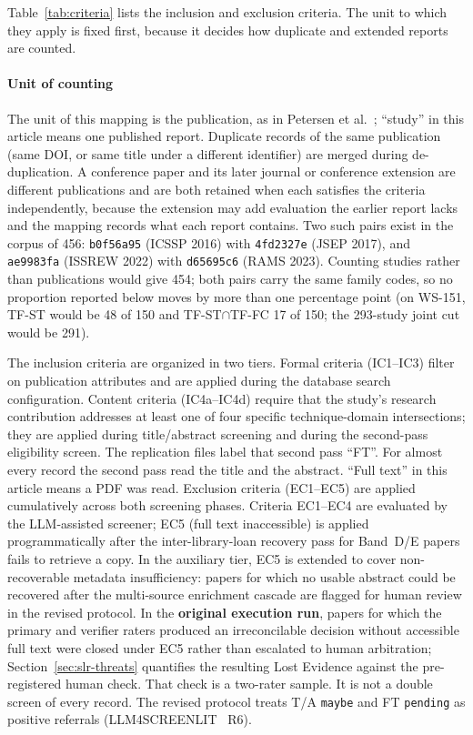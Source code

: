 Table~\ref{tab:criteria} lists the inclusion and exclusion criteria. The
unit to which they apply is fixed first, because it decides how duplicate
and extended reports are counted.

\paragraph{Unit of counting} The unit of this mapping is the publication,
as in Petersen et al.~\cite{petersen2015}; ``study'' in this article means
one published report. Duplicate records of the same publication (same
DOI, or same title under a different identifier) are merged during
de-duplication. A conference paper and its later journal or conference
extension are different publications and are both retained when each
satisfies the criteria independently, because the extension may add
evaluation the earlier report lacks and the mapping records what each
report contains. Two such pairs exist in the corpus of 456:
\texttt{b0f56a95} (ICSSP 2016) with \texttt{4fd2327e} (JSEP 2017), and
\texttt{ae9983fa} (ISSREW 2022) with \texttt{d65695c6} (RAMS 2023).
Counting studies rather than publications would give 454; both pairs
carry the same family codes, so no proportion reported below moves by
more than one percentage point (on WS-151, TF-ST would be 48 of 150 and
TF-ST$\cap$TF-FC 17 of 150; the 293-study joint cut would be 291).

The inclusion criteria are organized in two tiers. Formal criteria
(IC1--IC3) filter on publication attributes and are applied during the
database search configuration. Content criteria (IC4a--IC4d) require that the
study's research contribution addresses at least one of four specific
technique-domain intersections; they are applied during title/abstract
screening and during the second-pass eligibility screen. The replication
files label that second pass ``FT''. For almost every record the second
pass read the title and the abstract. ``Full text'' in this article means
a PDF was read. Exclusion criteria (EC1--EC5) are applied cumulatively
across both screening phases. Criteria EC1--EC4 are evaluated by the
LLM-assisted screener; EC5 (full text inaccessible) is applied
programmatically after the inter-library-loan recovery pass for Band~D/E
papers fails to retrieve a copy. In the auxiliary tier, EC5 is extended to
cover non-recoverable metadata insufficiency: papers for which no usable
abstract could be recovered after the multi-source enrichment cascade are
flagged for human review in the revised protocol. In the \textbf{original
execution run}, papers for which the primary and verifier raters produced an
irreconcilable decision without accessible full text were closed under EC5
rather than escalated to human arbitration; Section~\ref{sec:slr-threats}
quantifies the resulting Lost Evidence against the pre-registered human
check. That check is a two-rater sample. It is not a double screen of
every record. The revised protocol treats T/A \texttt{maybe} and FT
\texttt{pending} as positive referrals (LLM4SCREENLIT~\cite{llm4screenlit2025}
R6).

